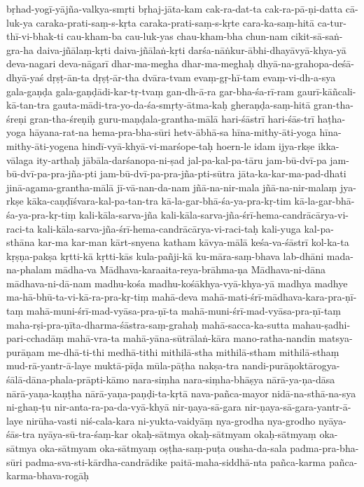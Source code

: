 {{bṛhad-yogī-yājña-valkya-smṛti
bṛhaj-jāta-kam
cak-ra-dat-ta
cak-ra-pā-ṇi-datta
cā-luk-ya
caraka-prati-saṃ-s-kṛta
caraka-prati-saṃ-s-kṛte
cara-ka-saṃ-hitā
ca-tur-thī-vi-bhak-ti
cau-kham-ba
cau-luk-yas
chau-kham-bha
chun-nam
cikit-sā-saṅ-gra-ha
daiva-jñālaṃ-kṛti
daiva-jñālaṅ-kṛti
darśa-nāṅkur-ābhi-dhayāvyā-khya-yā
deva-nagari
deva-nāgarī
dhar-ma-megha
dhar-ma-meghaḥ
dhyā-na-grahopa-deśā-dhyā-yaś
dṛṣṭ-ān-ta
dṛṣṭ-ār-tha
dvāra-tvam
evaṃ-gṛ-hī-tam
evaṃ-vi-dh-a-sya
gala-gaṇḍa
gala-gaṇḍādi-kar-tṛ-tvaṃ
gan-dh-ā-ra
gar-bha-śa-rī-ram
gaurī-kāñcali-kā-tan-tra
gauta-mādi-tra-yo-da-śa-smṛty-ātma-kaḥ
gheraṇḍa-saṃ-hitā
gran-tha-śreṇi
gran-tha-śreṇiḥ
guru-maṇḍala-grantha-mālā
hari-śāstrī
hari-śās-trī
haṭha-yoga
hāyana-rat-na
hema-pra-bha-sūri
hetv-ābhā-sa
hīna-mithy-āti-yoga
hīna-mithy-āti-yogena
hindī-vyā-khyā-vi-marśope-taḥ
hoern-le
idam
ijya-rkṣe
ikka-vālaga
ity-arthaḥ
jābāla-darśanopa-ni-ṣad
jal-pa-kal-pa-tāru
jam-bū-dvī-pa
jam-bū-dvī-pa-pra-jña-pti
jam-bū-dvī-pa-pra-jña-pti-sūtra
jāta-ka-kar-ma-pad-dhati
jinā-agama-grantha-mālā
jī-vā-nan-da-nam
jñā-na-nir-mala
jñā-na-nir-malaṃ
jya-rkṣe
kāka-caṇḍīśvara-kal-pa-tan-tra
kā-la-gar-bhā-śa-ya-pra-kṛ-tim
kā-la-gar-bhā-śa-ya-pra-kṛ-tiṃ
kali-kāla-sarva-jña
kali-kāla-sarva-jña-śrī-hema-candrācārya-vi-raci-ta
kali-kāla-sarva-jña-śrī-hema-candrācārya-vi-raci-taḥ
kali-yuga
kal-pa-sthāna
kar-ma
kar-man
kārt-snyena
katham
kāvya-mālā
keśa-va-śāstrī
kol-ka-ta
kṛṣṇa-pakṣa
kṛtti-kā
kṛtti-kās
kula-pañji-kā
ku-māra-saṃ-bhava
lab-dhāni
mada-na-phalam
mādha-va
Mādhava-karaaita-reya-brāhma-ṇa
Mādhava-ni-dāna
mādhava-ni-dā-nam
madhu-kośa
madhu-kośākhya-vyā-khya-yā
madhya
madhye
ma-hā-bhū-ta-vi-kā-ra-pra-kṛ-tiṃ
mahā-deva
mahā-mati-śrī-mādhava-kara-pra-ṇī-taṃ
mahā-muni-śrī-mad-vyāsa-pra-ṇī-ta
mahā-muni-śrī-mad-vyāsa-pra-ṇī-taṃ
maha-rṣi-pra-ṇīta-dharma-śāstra-saṃ-grahaḥ
mahā-sacca-ka-sutta
mahau-ṣadhi-pari-cchadāṃ
mahā-vra-ta
mahā-yāna-sūtrālaṅ-kāra
mano-ratha-nandin
matsya-purāṇam
me-dhā-ti-thi
medhā-tithi
mithilā-stha
mithilā-stham
mithilā-sthaṃ
mud-rā-yantr-ā-laye
muktā-pīḍa
mūla-pāṭha
nakṣa-tra
nandi-purāṇoktārogya-śālā-dāna-phala-prāpti-kāmo
nara-siṃha
nara-siṃha-bhāṣya
nārā-ya-ṇa-dāsa
nārā-yaṇa-kaṇṭha
nārā-yaṇa-paṇḍi-ta-kṛtā
nava-pañca-mayor
nidā-na-sthā-na-sya
ni-ghaṇ-ṭu
nir-anta-ra-pa-da-vyā-khyā
nir-ṇaya-sā-gara
nir-ṇaya-sā-gara-yantr-ā-laye
nirūha-vasti
niś-cala-kara
ni-yukta-vaidyāṃ
nya-grodha
nya-grodho
nyāya-śās-tra
nyāya-sū-tra-śaṃ-kar
okaḥ-sātmya
okaḥ-sātmyam
okaḥ-sātmyaṃ
oka-sātmya
oka-sātmyam
oka-sātmyaṃ
oṣṭha-saṃ-puṭa
ousha-da-sala
padma-pra-bha-sūri
padma-sva-sti-kārdha-candrādike
paitā-maha-siddhā-nta
pañca-karma
pañca-karma-bhava-rogāḥ
}}

